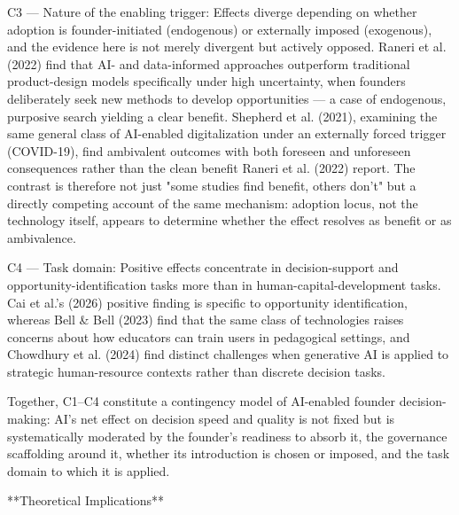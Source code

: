 \documentclass[11pt, a4paper]{article}
\begin{document}
C3 — Nature of the enabling trigger: Effects diverge depending on whether adoption is founder-initiated (endogenous) or externally imposed (exogenous), and the evidence here is not merely divergent but actively opposed. Raneri et al. (2022) find that AI- and data-informed approaches outperform traditional product-design models specifically under high uncertainty, when founders deliberately seek new methods to develop opportunities — a case of endogenous, purposive search yielding a clear benefit. Shepherd et al. (2021), examining the same general class of AI-enabled digitalization under an externally forced trigger (COVID-19), find ambivalent outcomes with both foreseen and unforeseen consequences rather than the clean benefit Raneri et al. (2022) report. The contrast is therefore not just "some studies find benefit, others don't" but a directly competing account of the same mechanism: adoption locus, not the technology itself, appears to determine whether the effect resolves as benefit or as ambivalence.

C4 — Task domain: Positive effects concentrate in decision-support and opportunity-identification tasks more than in human-capital-development tasks. Cai et al.'s (2026) positive finding is specific to opportunity identification, whereas Bell & Bell (2023) find that the same class of technologies raises concerns about how educators can train users in pedagogical settings, and Chowdhury et al. (2024) find distinct challenges when generative AI is applied to strategic human-resource contexts rather than discrete decision tasks.

Together, C1–C4 constitute a contingency model of AI-enabled founder decision-making: AI's net effect on decision speed and quality is not fixed but is systematically moderated by the founder's readiness to absorb it, the governance scaffolding around it, whether its introduction is chosen or imposed, and the task domain to which it is applied.

**Theoretical Implications**
\end{document}
